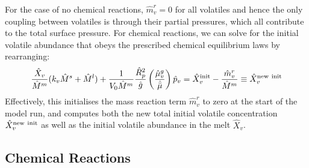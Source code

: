 For the case of no chemical reactions, $\hat{m}_v^r=0$ for all volatiles and hence the only coupling between volatiles is through their partial pressures, which all contribute to the total surface pressure.  For chemical reactions, we can solve for the initial volatile abundance that obeys the prescribed chemical equilibrium laws by rearranging:
\begin{equation}
\frac{\hat{X}_v}{\hat{M}^m} (k_v \hat{M}^s + \hat{M}^l) + \frac{1}{V_0 \hat{M}^m} \frac{\hat{R}_p^2}{\hat{g}} \left( \frac{\hat{\mu}_v^g}{\hat{\bar{\mu}}} \right)\hat{p}_v = \hat{X}_v^{\rm init} - \frac{\hat{m}_v^r}{\hat{M}^m} \equiv \hat{X}_v^{\rm new\ init} 
\label{eq:volinit3}
\end{equation}
Effectively, this initialises the mass reaction term $\hat{m}^r_v$ to zero at the start of the model run, and computes both the new total initial volatile concentration $\hat{X}_v^{\rm new\ init}$ as well as the initial volatile abundance in the melt $\hat{X}_v$.  
\subsection{Chemical Reactions}
\label{sect:chemreact}
